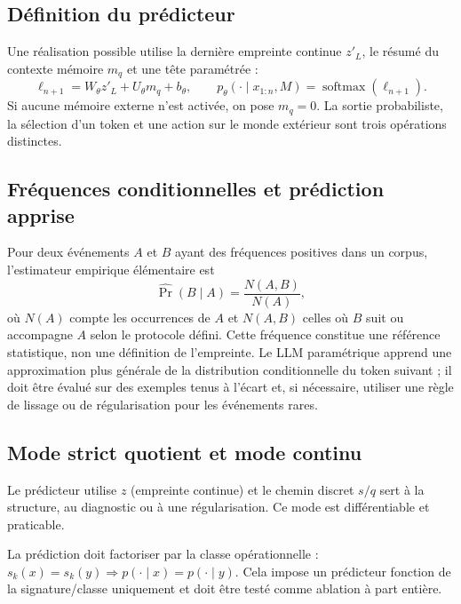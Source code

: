 \documentclass[11pt,a4paper]{article}
\theoremstyle{remark}
\newcommand{\softmax}{\operatorname{softmax}}
\begin{document}
\subsection{Définition du prédicteur}
Une réalisation possible utilise la dernière empreinte continue $z'_L$, le résumé du contexte mémoire $m_q$ et une tête paramétrée :
\[
\ell_{n+1}=W_\theta z'_L+U_\theta m_q+b_\theta,\qquad
p_\theta(\cdot\mid x_{1:n},M)=\softmax(\ell_{n+1}).
\]
Si aucune mémoire externe n'est activée, on pose $m_q=0$. La sortie probabiliste, la sélection d'un token et une action sur le monde extérieur sont trois opérations distinctes.

\subsection{Fréquences conditionnelles et prédiction apprise}
Pour deux événements $A$ et $B$ ayant des fréquences positives dans un corpus, l'estimateur empirique élémentaire est
\[
\widehat{\Pr}(B\mid A)=\frac{N(A,B)}{N(A)},
\]
où $N(A)$ compte les occurrences de $A$ et $N(A,B)$ celles où $B$ suit ou accompagne $A$ selon le protocole défini. Cette fréquence constitue une référence statistique, non une définition de l'empreinte. Le LLM paramétrique apprend une approximation plus générale de la distribution conditionnelle du token suivant ; il doit être évalué sur des exemples tenus à l'écart et, si nécessaire, utiliser une règle de lissage ou de régularisation pour les événements rares.

\subsection{Mode strict quotient et mode continu}
\begin{description}[style=nextline,leftmargin=3.5cm]
  \item[Mode continu recommandé pour le prototype] Le prédicteur utilise $z$ (empreinte continue) et le chemin discret $s/q$ sert à la structure, au diagnostic ou à une régularisation. Ce mode est différentiable et praticable.
  \item[Mode quotient strict] La prédiction doit factoriser par la classe opérationnelle : $s_k(x)=s_k(y)\Rightarrow p(\cdot\mid x)=p(\cdot\mid y)$. Cela impose un prédicteur fonction de la signature/classe uniquement et doit être testé comme ablation à part entière.
\end{description}

\end{document}
